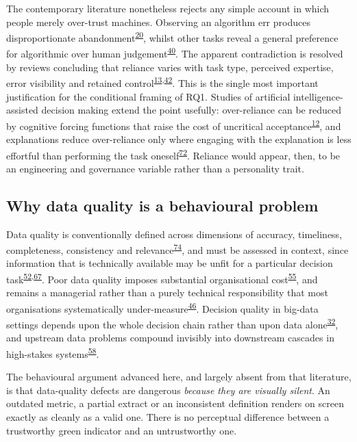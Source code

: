 \documentclass[11pt,a4paper]{article}
\numberwithin{figure}{section}
\numberwithin{table}{section}
\begin{document}
The contemporary literature nonetheless rejects any simple account in which people merely over-trust
machines. Observing an algorithm err produces disproportionate abandonment\textsuperscript{\hyperlink{ref20}{20}}, whilst other
tasks reveal a general preference for algorithmic over human judgement\textsuperscript{\hyperlink{ref40}{40}}. The apparent
contradiction is resolved by reviews concluding that reliance varies with task type, perceived expertise,
error visibility and retained control\textsuperscript{\hyperlink{ref13}{13},\hyperlink{ref42}{42}}. This is the single most important
justification for the conditional framing of RQ1. Studies of artificial intelligence-assisted decision
making extend the point usefully: over-reliance can be reduced by cognitive forcing functions that raise
the cost of uncritical acceptance\textsuperscript{\hyperlink{ref12}{12}}, and explanations reduce over-reliance only where engaging
with the explanation is less effortful than performing the task oneself\textsuperscript{\hyperlink{ref72}{72}}. Reliance would
appear, then, to be an engineering and governance variable rather than a personality trait.

\subsection{Why data quality is a behavioural problem}

Data quality is conventionally defined across dimensions of accuracy, timeliness, completeness, consistency
and relevance\textsuperscript{\hyperlink{ref74}{74}}, and must be assessed in context, since information that is technically available
may be unfit for a particular decision task\textsuperscript{\hyperlink{ref52}{52},\hyperlink{ref67}{67}}. Poor data quality imposes
substantial organisational cost\textsuperscript{\hyperlink{ref55}{55}}, and remains a managerial rather than a purely technical
responsibility that most organisations systematically under-measure\textsuperscript{\hyperlink{ref46}{46}}. Decision quality in
big-data settings depends upon the whole decision chain rather than upon data alone\textsuperscript{\hyperlink{ref32}{32}}, and
upstream data problems compound invisibly into downstream cascades in high-stakes
systems\textsuperscript{\hyperlink{ref58}{58}}.

The behavioural argument advanced here, and largely absent from that literature, is that data-quality
defects are dangerous \emph{because they are visually silent}. An outdated metric, a partial extract or an
inconsistent definition renders on screen exactly as cleanly as a valid one. There is no perceptual
difference between a trustworthy green indicator and an untrustworthy one.
\end{document}
